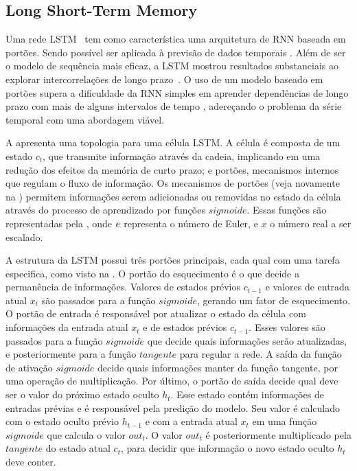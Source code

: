 \subsection{Long Short-Term Memory}
\label{sec:lstm}

Uma rede \acrfull{LSTM}~\cite{lstm} tem como característica uma arquitetura de \acrshort{RNN} baseada em portões. Sendo possível ser aplicada à previsão de dados temporais \cite{deep_learning}. Além de ser o modelo de sequência mais eficaz, a LSTM mostrou resultados substanciais ao explorar intercorrelações de longo prazo~\cite{lstm, deep_learning}. O uso de um modelo baseado em portões supera a dificuldade da \acrshort{RNN} simples em aprender dependências de longo prazo com mais de alguns intervalos de tempo \cite{lstm}, adereçando o problema da série temporal com uma abordagem viável.

%

A  apresenta uma topologia para uma célula \acrshort{LSTM}. A célula é composta de um estado $c_t$, que transmite informação através da cadeia, implicando em uma redução dos efeitos da memória de curto prazo; e portões, mecanismos internos que regulam o fluxo de informação. Os mecanismos de portões (veja novamente na ) permitem informações serem adicionadas ou removidas no estado da célula através do processo de aprendizado por funções $sigmoide$. Essas funções são representadas pela , onde $\mathnormal{e}$ representa o número de Euler, e $x$ o número real a ser escalado.


A estrutura da \acrshort{LSTM} possui três portões principais, cada qual com uma tarefa especifica, como visto na . O portão do esquecimento é o que decide a permanência de informações. Valores de estados prévios $c_{t-1}$ e valores de entrada atual $x_t$ são passados para a função $sigmoide$, gerando um fator de esquecimento. O portão de entrada é responsável por atualizar o estado da célula com informações da entrada atual $x_t$ e de estados prévios $c_{t-1}$. Esses valores são passados para a função $sigmoide$ que decide quais informações serão atualizadas, e posteriormente para a função $tangente$ para regular a rede. A saída da função de ativação $sigmoide$ decide quais informações manter da função tangente, por uma operação de multiplicação. Por último, o portão de saída decide qual deve ser o valor do próximo estado oculto $h_t$. Esse estado contém informações de entradas prévias e é responsável pela predição do modelo. Seu valor é calculado com o estado oculto prévio $h_{t-1}$ e com a entrada atual $x_t$ em uma função $sigmoide$ que calcula o valor $out_t$. O valor $out_t$ é posteriormente multiplicado pela $tangente$ do estado atual $c_t$, para decidir que informação o novo estado oculto $h_t$ deve conter.

